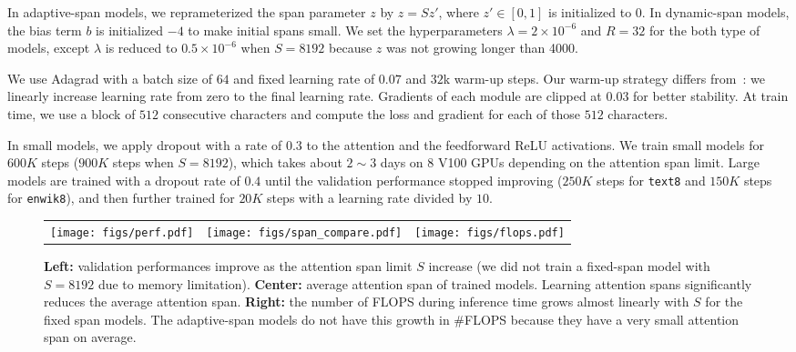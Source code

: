 \documentclass[11pt,a4paper]{article}
\begin{document}
In adaptive-span models, we reprameterized the span parameter $z$ by $z=S z' $, where $z' \in [0, 1]$ is initialized to $0$. In dynamic-span models, the bias term $b$ is initialized $-4$ to make initial spans small.
We set the hyperparameters $\lambda=2\times 10^{-6}$ and $R=32$ for the both type of models, except $\lambda$ is reduced to $0.5\times 10^{-6}$ when $S=8192$ because $z$ was not growing longer than 4000.

We use Adagrad with a batch size of $64$ and fixed learning rate of $0.07$ and $32$k warm-up steps.
Our warm-up strategy differs from~\citet{vaswani2017attention}: we linearly increase learning rate from zero to the final learning rate.
Gradients of each module are clipped at $0.03$ for better stability.
At train time, we use a block of $512$ consecutive characters and compute the loss and gradient for each of those $512$ characters.

In small models, we apply dropout with a rate of $0.3$ to the attention and the feedforward ReLU activations.
We train small models for $600K$ steps ($900K$ steps when $S=8192$), which takes about $2 \sim 3$ days on $8$ V100 GPUs depending on the attention span limit.
Large models are trained with a dropout rate of $0.4$ until the validation performance stopped improving ($250K$ steps for \texttt{text8} and $150K$ steps for \texttt{enwik8}), and then further trained for $20K$ steps with a learning rate divided by $10$.

\begin{figure*}[t]
\centering
  \begin{tabular}{lcr}
    \texttt{[image: figs/perf.pdf]}&
    \texttt{[image: figs/span\_compare.pdf]}&
    \texttt{[image: figs/flops.pdf]}
  \end{tabular}
  \vspace{-4mm}
  \caption{\textbf{Left:} validation performances improve as the attention span limit $S$ increase (we did not train a fixed-span model with $S=8192$ due to memory limitation).
  \textbf{Center:} average attention span of trained models. Learning attention spans significantly reduces the average attention span.
  \textbf{Right:} the number of FLOPS during inference time grows almost linearly with $S$ for the fixed span models. The adaptive-span models do not have this growth in \#FLOPS because they have a very small attention span on average.}
\label{fig:perf}
\end{figure*}
\end{document}

